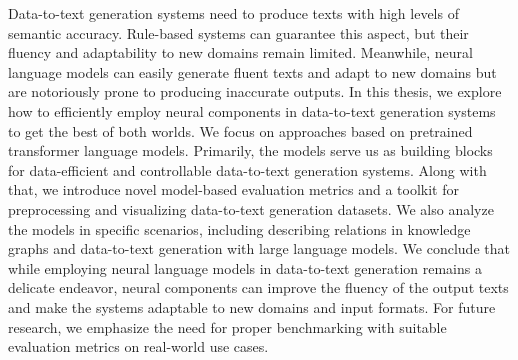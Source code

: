 

Data-to-text generation systems need to produce texts with high levels of semantic accuracy. Rule-based systems can guarantee this aspect, but their fluency and adaptability to new domains remain limited. Meanwhile, neural language models can easily generate fluent texts and adapt to new domains but are notoriously prone to producing inaccurate outputs. In this thesis, we explore how to efficiently employ neural components in data-to-text generation systems to get the best of both worlds. We focus on approaches based on pretrained transformer language models. Primarily, the models serve us as building blocks for data-efficient and controllable data-to-text generation systems. Along with that, we introduce novel model-based evaluation metrics and a toolkit for preprocessing and visualizing data-to-text generation datasets. We also analyze the models in specific scenarios, including describing relations in knowledge graphs and data-to-text generation with large language models. We conclude that while employing neural language models in data-to-text generation remains a delicate endeavor, neural components can improve the fluency of the output texts and make the systems adaptable to new domains and input formats. For future research, we emphasize the need for proper benchmarking with suitable evaluation metrics on real-world use cases.
